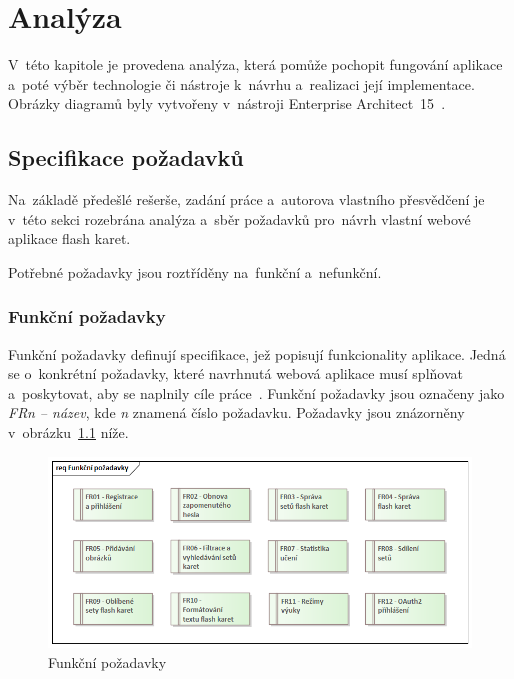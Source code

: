 \documentclass[twoside]{ctuthesis}
\begin{document}
\chapter{Analýza}

V~této kapitole je provedena analýza, která pomůže pochopit fungování aplikace a~poté výběr technologie či nástroje k~návrhu a~realizaci její implementace. Obrázky diagramů byly vytvořeny v~nástroji Enterprise Architect~15~\cite{ea}.

\section{Specifikace požadavků}

Na~základě předešlé rešerše, zadání práce a~autorova vlastního přesvědčení je v~této sekci rozebrána analýza a~sběr požadavků pro~návrh vlastní webové aplikace flash karet.

Potřebné požadavky jsou roztříděny na~funkční a~nefunkční.

\subsection{Funkční požadavky}

Funkční požadavky definují specifikace, jež popisují funkcionality aplikace. Jedná se o~konkrétní požadavky, které navrhnutá webová aplikace musí splňovat a~poskytovat, aby se naplnily cíle práce~\cite{frnfr}. Funkční požadavky jsou označeny jako \emph{FRn -- název}, kde \emph{n} znamená číslo požadavku. Požadavky jsou znázorněny v~obrázku~\ref{fig:fr} níže.

\begin{figure}[H]
\centering
\includegraphics[width=1\textwidth]{Funkční Požadavky.png}
\caption{Funkční požadavky}
\label{fig:fr}
\end{figure}

\newpage
\end{document}
